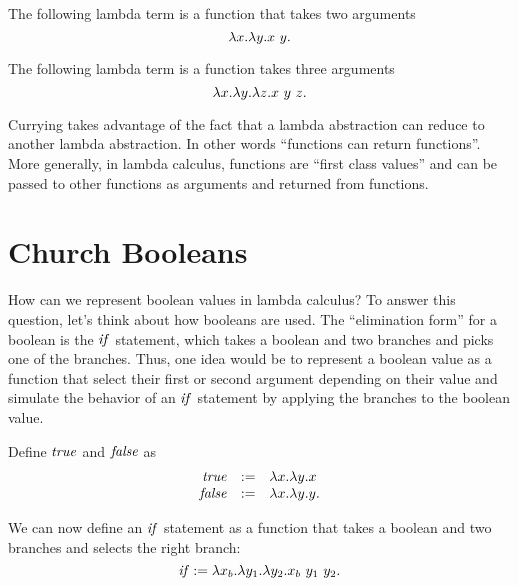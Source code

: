 \begin{example}[Currying]
\label{xmpl:lcc::currying}
The following lambda term is a function that takes two arguments
\[
\lambda x. \lambda y. x~y.
\]

The following lambda term is a function takes three arguments
\[
\lambda x. \lambda y. \lambda z. x~y~z.
\]
\end{example}

\begin{note}
\label{nt:lcc::first-class}
Currying takes advantage of the fact that a lambda abstraction can reduce to another lambda abstraction.
%
In other words ``functions can return functions''. 
%
More generally, in lambda calculus, functions are ``first class values'' and can be passed to other functions as arguments and returned from functions.
%
\end{note}

\section{Church Booleans}
\label{sec:lcc:bools}

\begin{gram}
\label{grm:lcc::bools::intro}
How can we represent boolean values in lambda calculus?  
%
To answer this question, let's think about how booleans are
used.  
%
The ``elimination form'' for a boolean is the $\mathit{if}$ statement, which
takes a boolean and two branches and picks one of the branches.  
%
Thus, one idea would be to represent a boolean value as a function that select their first or second argument depending on their value and  simulate the behavior of an $\mathit{if}$ statement by applying the branches to the boolean
value.
\end{gram}

\begin{gram}
\label{grm:lcc::bools::encoding}
Define $\mathit{true}$ and $\mathit{false}$ as
\[
\begin{array}{rcl}
\mathit{true} & := & \lambda x. \lambda y.  x
\\
\mathit{false} & := & \lambda x. \lambda y. y.
\end{array}
\]

We can now define an $\mathit{if}$ statement as a function that takes a
boolean and two branches and selects the right branch:
\[
\mathit{if} := \lambda x_b. \lambda y_1. \lambda y_2. x_b~ y_1~ y_2.
\]
\end{gram}


